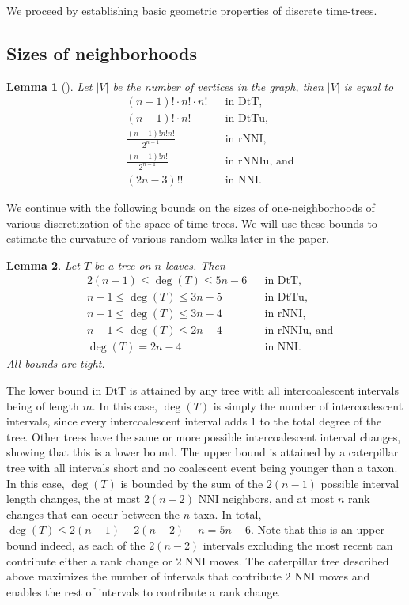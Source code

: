 \documentclass{amsart}
\newtheorem{lemma}{Lemma}
\theoremstyle{definition}
\newcommand{\nni}{\mathrm{NNI}}
\newcommand{\rnni}{\mathrm{rNNI}}
\newcommand{\rnniu}{\mathrm{rNNIu}}
\newcommand{\dtt}{\mathrm{DtT}}
\newcommand{\dttu}{\mathrm{DtTu}}
\begin{document}
We proceed by establishing basic geometric properties of discrete time-trees.


\subsection{Sizes of neighborhoods}

\begin{lemma}[\textcite{Semple2003-nj}]\label{spaceSizes}
Let $|V|$ be the number of vertices in the graph, then $|V|$ is equal to
\begin{align*}
& (n-1)! \cdot n! \cdot n!	&& \mbox{in $\dtt$,}\\
& (n-1)! \cdot n!		&& \mbox{in $\dttu$,}\\
& \frac{(n-1)!n!n!}{2^{n-1}}	&& \mbox{in $\rnni$,}\\
& \frac{(n-1)!n!}{2^{n-1}}	&& \mbox{in $\rnniu$, and}\\
& (2n - 3)!!			&& \mbox{in $\nni$.}
\end{align*}
\end{lemma}

We continue with the following bounds on the sizes of one-neighborhoods of various discretization of the space of time-trees.
We will use these bounds to estimate the curvature of various random walks later in the paper.

\begin{lemma}\label{neighBound}
Let $T$ be a tree on $n$ leaves.
Then
\begin{align*}
& 2(n-1) \leq \deg(T) \leq 5n-6	&& \mbox{in $\dtt$,}\\
& n-1 \leq \deg(T) \leq 3n-5	&& \mbox{in $\dttu$,}\\
& n-1\leq \deg(T) \leq3n-4 	&& \mbox{in $\rnni$,}\\
& n-1 \leq \deg(T) \leq 2n-4 	&& \mbox{in $\rnniu$, and}\\
& \deg(T) = 2n-4 		&& \mbox{in $\nni$.}
\end{align*}
All bounds are tight.
\end{lemma}

\proof
The lower bound in $\dtt$ is attained by any tree with all intercoalescent intervals being of length $m$.
In this case, $\deg(T)$ is simply the number of intercoalescent intervals, since every intercoalescent interval adds $1$ to the total degree of the tree.
Other trees have the same or more possible intercoalescent interval changes, showing that this is a lower bound.
The upper bound is attained by a caterpillar tree with all intervals short and no coalescent event being younger than a taxon.
In this case, $\deg(T)$ is bounded by the sum of the $2(n-1)$ possible interval length changes, the at most $2(n-2)$ NNI neighbors, and at most $n$ rank changes that can occur between the $n$ taxa.
In total, $\deg(T) \le 2(n-1) + 2(n-2) + n = 5n-6$.
Note that this is an upper bound indeed, as each of the $2(n-2)$ intervals excluding the most recent can contribute either a rank change or $2$ NNI moves.
The caterpillar tree described above maximizes the number of intervals that contribute $2$ NNI moves and enables the rest of intervals to contribute a rank change.
\end{document}
